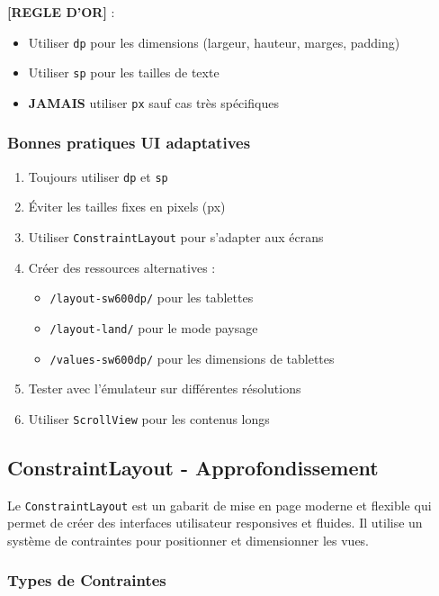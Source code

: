 \documentclass[11pt,a4paper]{article}
\begin{document}
\textbf{[REGLE D'OR]} : 
\begin{itemize}
    \item Utiliser \texttt{dp} pour les dimensions (largeur, hauteur, marges, padding)
    \item Utiliser \texttt{sp} pour les tailles de texte
    \item \textbf{JAMAIS} utiliser \texttt{px} sauf cas très spécifiques
\end{itemize}

\subsubsection{Bonnes pratiques UI adaptatives}

\begin{enumerate}
    \item Toujours utiliser \texttt{dp} et \texttt{sp}
    \item Éviter les tailles fixes en pixels (px)
    \item Utiliser \texttt{ConstraintLayout} pour s'adapter aux écrans
    \item Créer des ressources alternatives :
    \begin{itemize}
        \item \texttt{/layout-sw600dp/} pour les tablettes
        \item \texttt{/layout-land/} pour le mode paysage
        \item \texttt{/values-sw600dp/} pour les dimensions de tablettes
    \end{itemize}
    \item Tester avec l'émulateur sur différentes résolutions
    \item Utiliser \texttt{ScrollView} pour les contenus longs
\end{enumerate}

\subsection{ConstraintLayout - Approfondissement}

Le \texttt{ConstraintLayout} est un gabarit de mise en page moderne et flexible qui permet de créer des interfaces utilisateur responsives et fluides. Il utilise un système de contraintes pour positionner et dimensionner les vues.

\subsubsection{Types de Contraintes}
\end{document}
